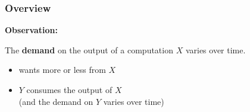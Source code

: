 \begin{frame}
\frametitle{Overview}
\textbf{Observation:}

The \textbf{demand} on the output of a computation $X$ varies over time.
\begin{itemize}
\item \pause {} wants more or less from $X$
\item \pause {} $Y$ consumes the output of
  $X$ \pause \\ (and the demand on $Y$ varies over time)
\end{itemize}
\end{frame}
